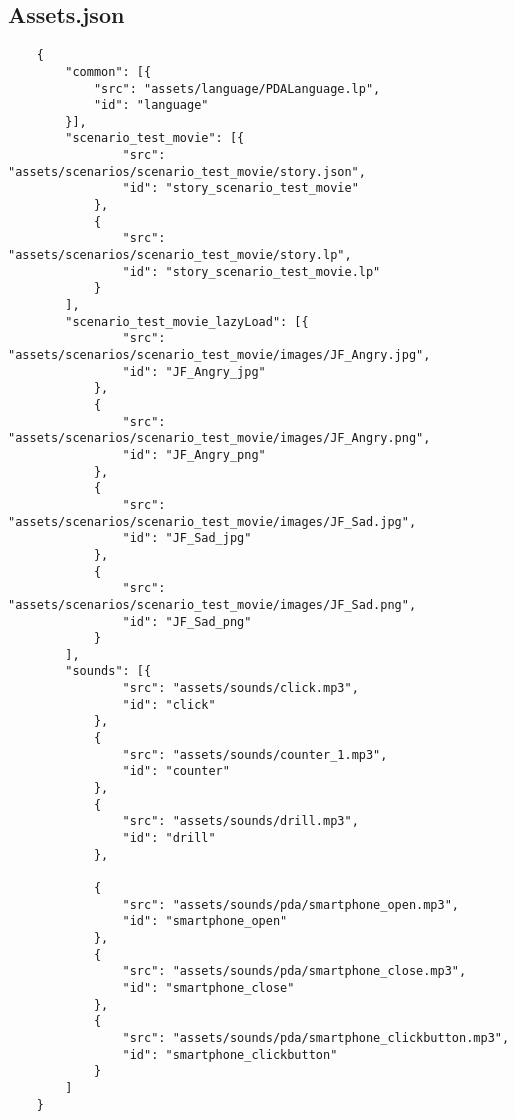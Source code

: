 \begin{appendices}
    \chapter{Assets.json}    
    \label{app:assetsjson}
    \lstset{language=JSON}
    \begin{lstlisting}
    {
        "common": [{
            "src": "assets/language/PDALanguage.lp",
            "id": "language"
        }],
        "scenario_test_movie": [{
                "src": "assets/scenarios/scenario_test_movie/story.json",
                "id": "story_scenario_test_movie"
            },
            {
                "src": "assets/scenarios/scenario_test_movie/story.lp",
                "id": "story_scenario_test_movie.lp"
            }
        ],
        "scenario_test_movie_lazyLoad": [{
                "src": "assets/scenarios/scenario_test_movie/images/JF_Angry.jpg",
                "id": "JF_Angry_jpg"
            },
            {
                "src": "assets/scenarios/scenario_test_movie/images/JF_Angry.png",
                "id": "JF_Angry_png"
            },
            {
                "src": "assets/scenarios/scenario_test_movie/images/JF_Sad.jpg",
                "id": "JF_Sad_jpg"
            },
            {
                "src": "assets/scenarios/scenario_test_movie/images/JF_Sad.png",
                "id": "JF_Sad_png"
            }
        ],
        "sounds": [{
                "src": "assets/sounds/click.mp3",
                "id": "click"
            },
            {
                "src": "assets/sounds/counter_1.mp3",
                "id": "counter"
            },
            {
                "src": "assets/sounds/drill.mp3",
                "id": "drill"
            },
    
            {
                "src": "assets/sounds/pda/smartphone_open.mp3",
                "id": "smartphone_open"
            },
            {
                "src": "assets/sounds/pda/smartphone_close.mp3",
                "id": "smartphone_close"
            },
            {
                "src": "assets/sounds/pda/smartphone_clickbutton.mp3",
                "id": "smartphone_clickbutton"
            }
        ]
    }
    \end{lstlisting}


\end{appendices}

